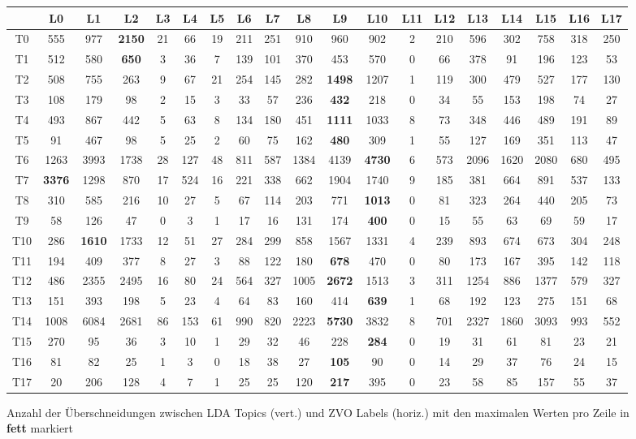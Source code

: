 \documentclass[german,version-2020-11]{uzl-thesis}
\begin{document}
\begin{figure}[H]
\begin{center}
\tiny
\renewcommand{\arraystretch}{2}
\begin{tabular}{ccccccccccccccccccc}
\hline
\hline 
&L0&L1&L2&L3&L4&L5&L6&L7&L8&L9&L10&L11&L12&L13&L14&L15&L16&L17\\
\hline
\hline
T0&555& 977& \textbf{2150}& 21& 66& 19& 211& 251& 910& 960& 902& 2& 210& 596& 302& 758& 318& 250\\
\hline 
T1&512& 580& \textbf{650}& 3& 36& 7& 139& 101& 370& 453& 570& 0& 66& 378& 91& 196& 123& 53\\
\hline 
T2&508& 755& 263& 9& 67& 21& 254& 145& 282& \textbf{1498}& 1207& 1& 119& 300& 479& 527& 177& 130\\
\hline 
T3&108& 179& 98& 2& 15& 3& 33& 57& 236& \textbf{432}& 218& 0& 34& 55& 153& 198& 74& 27\\
\hline 
T4&493& 867& 442& 5& 63& 8& 134& 180& 451& \textbf{1111}& 1033& 8& 73& 348& 446& 489& 191& 89\\
\hline 
T5&91& 467& 98& 5& 25& 2& 60& 75& 162& \textbf{480}& 309& 1& 55& 127& 169& 351& 113& 47\\
\hline 
T6&1263& 3993& 1738& 28& 127& 48& 811& 587& 1384& 4139& \textbf{4730}& 6& 573& 2096& 1620& 2080& 680& 495\\
\hline 
T7&\textbf{3376}& 1298& 870& 17& 524& 16& 221& 338& 662& 1904& 1740& 9& 185& 381& 664& 891& 537& 133\\
\hline 
T8&310& 585& 216& 10& 27& 5& 67& 114& 203& 771 & \textbf{1013}& 0& 81& 323& 264& 440& 205& 73\\
\hline 
T9&58& 126& 47& 0& 3& 1& 17& 16& 131& 174& \textbf{400}& 0& 15& 55& 63& 69& 59& 17\\
\hline 
T10&286& \textbf{1610}& 1733& 12& 51& 27& 284& 299& 858& 1567& 1331& 4& 239& 893& 674& 673& 304& 248\\
\hline 
T11&194& 409& 377& 8& 27& 3& 88& 122& 180& \textbf{678}& 470& 0& 80& 173& 167& 395& 142& 118\\
\hline 
T12&486& 2355& 2495& 16& 80& 24& 564& 327& 1005& \textbf{2672}& 1513& 3& 311& 1254& 886& 1377& 579& 327\\
\hline 
T13&151& 393& 198& 5& 23& 4& 64& 83& 160& 414& \textbf{639}& 1& 68& 192& 123& 275& 151& 68\\
\hline 
T14&1008& 6084& 2681& 86& 153& 61& 990& 820& 2223& \textbf{5730}& 3832& 8& 701& 2327& 1860& 3093& 993& 552\\
\hline 
T15&270& 95& 36& 3& 10& 1& 29& 32& 46& 228& \textbf{284}& 0& 19& 31& 61& 81& 23& 21\\
\hline 
T16&81& 82& 25& 1& 3& 0& 18& 38& 27& \textbf{105}& 90& 0& 14& 29& 37& 76& 24& 15\\
\hline
T17&20& 206& 128& 4& 7& 1& 25& 25& 120& \textbf{217}& 395& 0& 23& 58& 85& 157& 55& 37\\
\hline
\hline
\end{tabular}
\caption{Anzahl der Überschneidungen zwischen LDA Topics (vert.) und ZVO Labels (horiz.) mit den maximalen Werten pro Zeile in \textbf{fett} markiert}
\label{fig:matrixnormal}
\end{center}
\end{figure}
\end{document}
